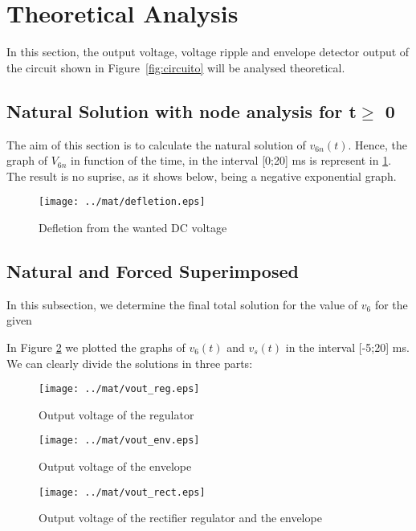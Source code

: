 \section{Theoretical Analysis}
\label{sec:analysis}

\hspace{0,5cm} In this section, the output voltage, voltage ripple and envelope detector output of the circuit shown in Figure~\ref{fig:circuito} will be analysed theoretical.


\subsection{Natural Solution with node analysis for t$\geq$ 0}
The aim of this section is to calculate the natural solution of $v_{6n} (t)$. 
Hence, the graph of $V_{6n}$ in function of the time, in the interval [0;20] ms is represent in \ref{fig:mat3}. The result is no suprise, as it shows below, being a negative exponential graph.

\begin{figure}[H] \centering
\texttt{[image: ../mat/defletion.eps]}
\caption{Defletion from the wanted DC voltage} 
\label{fig:mat3}
\end{figure}


\subsection{Natural and Forced Superimposed}
In this subsection, we determine the final total solution for the value of $v_6$ for the given 

In Figure \ref{fig:mat4} we plotted the graphs of $v_6(t)$ and $v_s(t)$ in the interval [-5;20] ms. We can clearly divide the solutions in three parts:


\begin{figure}[H] \centering
\texttt{[image: ../mat/vout\_reg.eps]}
\caption{Output voltage of the regulator}
\label{fig:mat4}
\end{figure}

\begin{figure}[H] \centering
\texttt{[image: ../mat/vout\_env.eps]}
\caption{Output voltage of the envelope}
\label{fig:mat5}
\end{figure}


\begin{figure}[H] \centering
\texttt{[image: ../mat/vout\_rect.eps]}
\caption{Output voltage of the rectifier regulator and the envelope}
\label{fig:mat6}
\end{figure}








